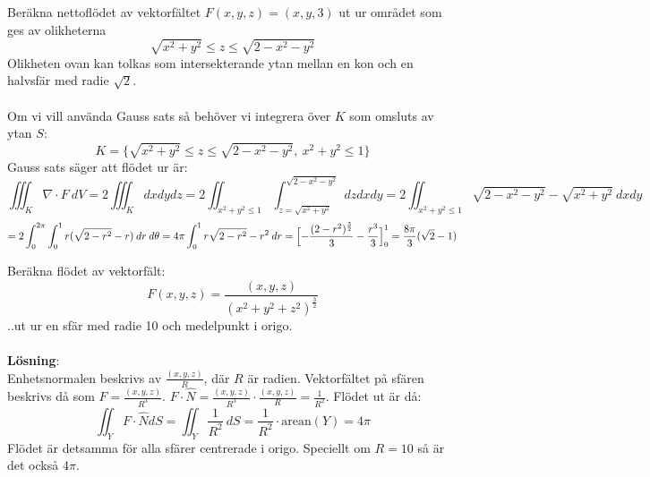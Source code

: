 \documentclass{report}
\begin{document}
\ex{}
{
Beräkna nettoflödet av vektorfältet $ F(x,y,z) = (x,y,3) $ ut ur området som ges av olikheterna
\begin{equation*}
\sqrt{x^2+y^2} \le z \le \sqrt{2-x^2-y^2} 
\end{equation*}
Olikheten ovan kan tolkas som intersekterande ytan mellan en kon och en halvsfär med radie $ \sqrt{2}  $.\\\\

Om vi vill använda Gauss sats så behöver vi integrera över $ K $ som omsluts av ytan $ S $:
\begin{equation*}
	K = \{ \sqrt{x^2+y^2} \le z \le \sqrt{2 - x^2-y^2}, \: x^2+y^2 \le 1  \}
\end{equation*}
Gauss sats säger att flödet ur är:
\begin{equation*}
\iiint_{K} \nabla \cdot F \: dV = 2 \iiint_{K} dxdydz = 2 \iint_{x^2+y^2 \le 1} \int_{z = \sqrt{x^2+y^2} }^{ \sqrt{2-x^2-y^2} }  \: dzdxdy = 2 \iint_{x^2+y^2 \le 1} \sqrt{2-x^2-y^2} - \sqrt{x^2+y^2} \: dxdy 
\end{equation*}
\begin{equation*}
	= 2 \int_{0}^{2\pi} \int_{0}^{1} r(\sqrt{2-r^2} -r) \: dr  \: d\theta = 4\pi \int_{0}^{1} r \sqrt{2-r^2} -r^2 \: dr = \Bigl[ - \frac{(2-r^2)^{ \frac{3}{2}  }}{3} - \frac{r^3}{3}   \Bigr]_{0}^{1} = \frac{8\pi}{3} ( \sqrt{2} -1)
\end{equation*}
}

\ex{}
{
Beräkna flödet av vektorfält:
\begin{equation*}
	F(x,y,z) = \frac{(x,y,z)}{(x^2+y^2+z^2)^{ \frac{3}{2}  }} 
\end{equation*}
..ut ur en sfär med radie 10 och medelpunkt i origo.\\\\

\textbf{Lösning}:\\
Enhetsnormalen beskrivs av $ \frac{(x,y,z)}{R}  $, där $ R $ är radien. Vektorfältet på sfären beskrivs då som $ F = \frac{(x,y,z)}{R^3} $. $ F \cdot \hat{N} = \frac{(x,y,z)}{R^3} \cdot \frac{(x,y,z)}{R} = \frac{1}{R^2} $. Flödet ut är då:
\begin{equation*}
	\iint_{Y} F \cdot \hat{N} dS = \iint_{Y} \frac{1}{R^2} \: dS = \frac{1}{R^2} \cdot \text{arean}(Y) = 4\pi
\end{equation*}
	Flödet är detsamma för alla sfärer centrerade i origo. Speciellt om $ R = 10 $ så är det också $ 4\pi $.
}
\end{document}
